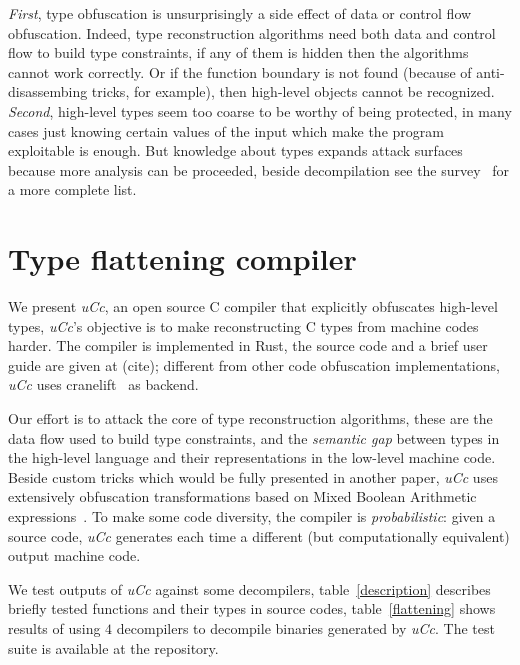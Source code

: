 \documentclass[a4paper]{llncs}
\begin{document}
\emph{First}, type obfuscation is unsurprisingly a side effect of data or control flow obfuscation.
Indeed, type reconstruction algorithms need both data and control flow to build type constraints,
if any of them is hidden
then the algorithms cannot work correctly. Or if the function boundary is not found
(because of anti-disassembing tricks, for example), then high-level objects cannot be recognized.
\emph{Second}, high-level types seem too coarse to be worthy
of being protected, in many cases just knowing certain values of the input which make the program
exploitable is enough. But knowledge about types expands attack surfaces because more analysis
can be proceeded, beside decompilation see the survey~\cite{caballero_type_2016} for a
more complete list.


\section{Type flattening compiler}
We present \emph{uCc}, an open source C compiler that explicitly obfuscates high-level types, \emph{uCc}'s
objective is to make reconstructing C types from machine codes harder.
The compiler is implemented in Rust, the source code and a brief user guide are given at (cite); different
from other code obfuscation implementations, \emph{uCc} uses cranelift~\cite{noauthor_cranelift_nodate} as
backend.

Our effort is to attack the core of type reconstruction algorithms,
these are the data flow used to build type constraints, and the \emph{semantic gap} between types in the high-level language and their
representations in the low-level machine code.
Beside custom tricks which would be fully presented in another paper, \emph{uCc} uses extensively
obfuscation transformations based on Mixed Boolean Arithmetic expressions~\cite{eyrolles_obfuscation_2017,zhou_information_2007}.
To make some code diversity, the compiler is \emph{probabilistic}: given a source
code, \emph{uCc} generates each time a different (but computationally equivalent) output machine code.

We test outputs of \emph{uCc} against some decompilers, table~\ref{description} describes briefly
tested functions and their types in source codes, table~\ref{flattening} shows results of using
$4$ decompilers to decompile binaries generated by \emph{uCc}. The test suite is available at
the repository.
\end{document}
